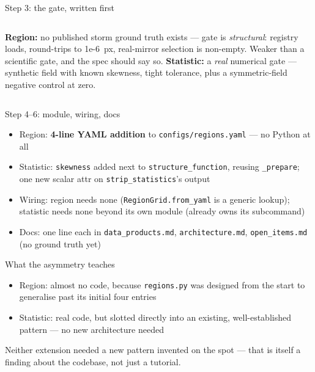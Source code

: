 \documentclass[aspectratio=169,11pt]{beamer}
\newcommand{\currevsec}{}
\newcommand{\revsec}[1]{\gdef\currevsec{#1}}
\begin{document}
\begin{frame}{Step 3: the gate, written first}
  \revsec{7}
  \begin{columns}
    \textbf{Region:} no published storm ground truth exists --- gate is \emph{structural}: registry loads, round-trips to 1e-6~px, real-mirror selection is non-empty. Weaker than a scientific gate, and the spec should say so.
    \textbf{Statistic:} a \emph{real} numerical gate --- synthetic field with known skewness, tight tolerance, plus a symmetric-field negative control at zero.
  \end{columns}
\end{frame}

\begin{frame}{Step 4--6: module, wiring, docs}
  \revsec{7}
  \begin{itemize}
    \item Region: \textbf{4-line YAML addition} to \texttt{configs/regions.yaml} --- no Python at all
    \item Statistic: \texttt{skewness} added next to \texttt{structure\_function}, reusing \texttt{\_prepare}; one new scalar attr on \texttt{strip\_statistics}'s output
    \item Wiring: region needs none (\texttt{RegionGrid.from\_yaml} is a generic lookup); statistic needs none beyond its own module (already owns its subcommand)
    \item Docs: one line each in \texttt{data\_products.md}, \texttt{architecture.md}, \texttt{open\_items.md} (no ground truth yet)
  \end{itemize}
\end{frame}

\begin{frame}{What the asymmetry teaches}
  \revsec{7}
  \begin{itemize}
    \item Region: almost no code, because \texttt{regions.py} was designed from the start to generalise past its initial four entries
    \item Statistic: real code, but slotted directly into an existing, well-established pattern --- no new architecture needed
  \end{itemize}
  \vspace{0.3cm}
  Neither extension needed a new pattern invented on the spot --- that is itself a finding about the codebase, not just a tutorial.
\end{frame}
\end{document}
